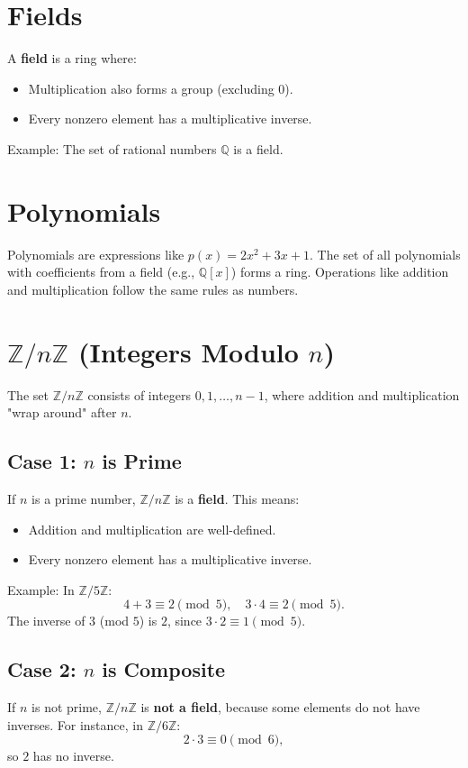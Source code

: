 \documentclass[12pt]{article}
\begin{document}
\section{Fields}
A \textbf{field} is a ring where:
\begin{itemize}
    \item Multiplication also forms a group (excluding $0$).
    \item Every nonzero element has a multiplicative inverse.
\end{itemize}
Example: The set of rational numbers $\mathbb{Q}$ is a field.

\section{Polynomials}
Polynomials are expressions like $p(x) = 2x^2 + 3x + 1$. The set of all polynomials with coefficients from a field (e.g., $\mathbb{Q}[x]$) forms a ring. Operations like addition and multiplication follow the same rules as numbers.

\section{$\mathbb{Z}/n\mathbb{Z}$ (Integers Modulo $n$)}
The set $\mathbb{Z}/n\mathbb{Z}$ consists of integers $0, 1, \dots, n-1$, where addition and multiplication "wrap around" after $n$. 

\subsection{Case 1: $n$ is Prime}
If $n$ is a prime number, $\mathbb{Z}/n\mathbb{Z}$ is a \textbf{field}. This means:
\begin{itemize}
    \item Addition and multiplication are well-defined.
    \item Every nonzero element has a multiplicative inverse.
\end{itemize}
Example: In $\mathbb{Z}/5\mathbb{Z}$:
\[ 4 + 3 \equiv 2 \pmod{5}, \quad 3 \cdot 4 \equiv 2 \pmod{5}. \]
The inverse of $3$ (mod $5$) is $2$, since $3 \cdot 2 \equiv 1 \pmod{5}$.

\subsection{Case 2: $n$ is Composite}
If $n$ is not prime, $\mathbb{Z}/n\mathbb{Z}$ is \textbf{not a field}, because some elements do not have inverses. For instance, in $\mathbb{Z}/6\mathbb{Z}$:
\[ 2 \cdot 3 \equiv 0 \pmod{6}, \]
so $2$ has no inverse.
\end{document}
